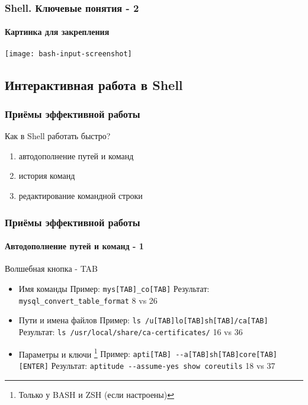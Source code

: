 \begin{frame}
  \frametitle{Shell. Ключевые понятия - 2}
  \framesubtitle{Картинка для закрепления}
    \hbox{\texttt{[image: bash-input-screenshot]}}
\end{frame}

\subsection{Интерактивная работа в Shell}

\begin{frame}
  \frametitle{Приёмы эффективной работы}

  \alert{\Large{Как в Shell работать быстро?}} 
  \pause

  \begin{enumerate}
    \item \Large{автодополнение путей и команд}
    \item \Large{история команд}
    \item \Large{редактирование командной строки}
  \end{enumerate}

\end{frame}

\begin{frame}[fragile]
  \frametitle{Приёмы эффективной работы}
  \framesubtitle{Автодополнение путей и команд - 1}

  \alert{\Large{Волшебная кнопка - TAB}} \newline
  \pause
  \begin{itemize}
    \item \Large{Имя команды} \pause \newline
      \small{Пример: \verb+mys[TAB]_co[TAB]+} \pause \newline
      \small{Результат: \verb+mysql_convert_table_format+} \newline
      \alert{8 vs 26} \pause
    \item \Large{Пути и имена файлов} \pause \newline
      \small{Пример: \verb+ls /u[TAB]lo[TAB]sh[TAB]/ca[TAB]+} \pause \newline
      \small{Результат: \verb+ls /usr/local/share/ca-certificates/+} \newline
      \alert{16 vs 36} \pause
    \item \Large{Параметры и ключи} \footnote{Только у BASH и ZSH (если настроены)} \pause \newline
      \small{Пример: \verb+apti[TAB] --a[TAB]sh[TAB]core[TAB][ENTER]+} \pause \newline
      \small{Результат: \verb+aptitude --assume-yes show coreutils+} \newline
      \alert{18 vs 37} \pause
  \end{itemize}
\end{frame}


